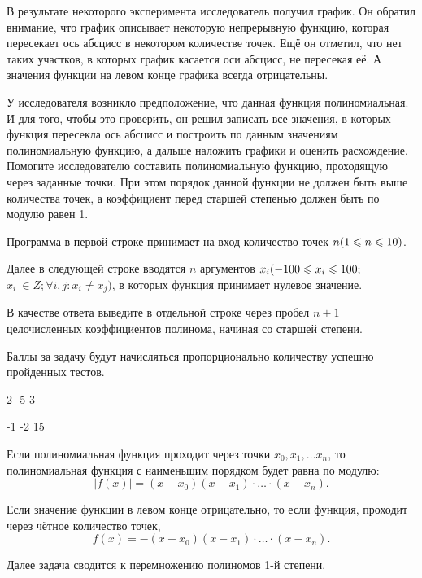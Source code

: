 
В результате некоторого эксперимента исследователь получил график. Он обратил внимание, что график описывает некоторую непрерывную функцию, которая пересекает ось абсцисс в некотором количестве точек. Ещё он отметил, что нет таких участков, в которых график касается оси абсцисс, не пересекая её. А значения функции на левом конце графика всегда отрицательны.

У исследователя возникло предположение, что данная функция полиномиальная. И для того, чтобы это проверить, он решил записать все значения, в которых функция пересекла ось абсцисс и построить по данным значениям полиномиальную функцию, а дальше наложить графики и оценить расхождение. Помогите исследователю составить полиномиальную функцию, проходящую через заданные точки. При этом порядок данной функции не должен быть выше количества точек, а коэффициент перед старшей степенью должен быть по модулю равен 1.


Программа в первой строке принимает на вход количество точек $n\space(1\leq n\leq 10)$.

Далее в следующей строке вводятся $n$  аргументов $x_i \space (-100 \leq x_i \leq 100;$ \linebreak $x_i~\in Z; \forall i, j:x_i \neq x_j)$, в которых функция принимает нулевое значение. 

\outputfmtSection

В качестве ответа выведите в отдельной строке через пробел $n+1$ целочисленных коэффициентов полинома, начиная со старшей степени.

\markSection

Баллы за задачу будут начисляться пропорционально количеству успешно пройденных тестов.


\begin{myverbbox}[\small]{\vinput}
    2
    -5 3
\end{myverbbox}

\begin{myverbbox}[\small]{\voutput}
    -1 -2 15
\end{myverbbox}

\solutionSection
Если полиномиальная функция проходит через точки $x_0, x_1,\dots x_n$, то полиномиальная функция с наименьшим порядком будет равна по модулю:
$$|f(x)| = (x - x_0)(x - x_1)\cdot\dots\cdot(x - x_n).$$ 

Если значение функции в левом конце отрицательно, то если функция, проходит через чётное количество точек,   
$$f(x) = -(x - x_0)(x - x_1)\cdot\dots\cdot(x - x_n).$$ 

Далее задача сводится к перемножению полиномов 1-й степени.

